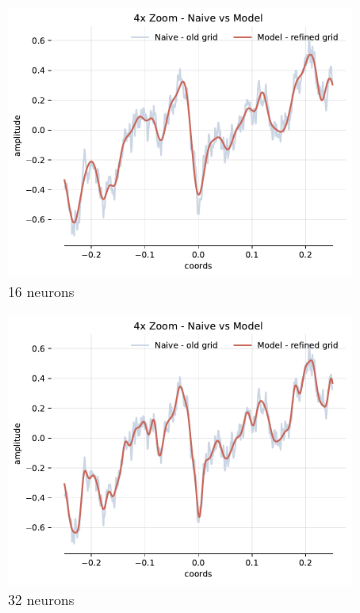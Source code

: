 \begin{figure}[!h]
    \begin{subfigure}[b]{0.32\textwidth}
        \centering
        \includegraphics[width=\textwidth]{img/ch4/4x-zoom-noise-1hl-16hf-w8.pdf}
        \caption{16 neurons}
        \label{fig:4x-zoom-noise-1hl-16hf-w8}
    \end{subfigure}
    \begin{subfigure}[b]{0.32\textwidth}
        \centering
        \includegraphics[width=\textwidth]{img/ch4/4x-zoom-noise-1hl-32hf-w8.pdf}
        \caption{32 neurons}
        \label{fig:comp-4x-zoom-noise-1hl-32hf-w8}
    \end{subfigure}
    \begin{subfigure}[b]{0.32\textwidth}

\end{subfigure}
\end{figure}
